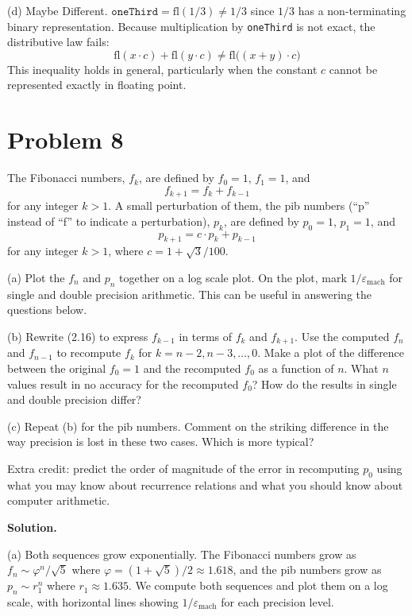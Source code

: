 \documentclass[letterpaper, 11pt]{article}
\newcommand{\1}{\mathds{1}}	%
\newcommand{\fl}{\text{fl}}	%
\theoremstyle{definition}
\begin{document}
\medskip

(d) Maybe Different.
$\texttt{oneThird} = \fl(1/3) \neq 1/3$ since $1/3$ has a non-terminating binary representation. Because multiplication by \texttt{oneThird} is not exact, the distributive law fails:
\[
\fl(x \cdot c) + \fl(y \cdot c) \neq \fl\bigl((x+y) \cdot c\bigr)
\]
This inequality holds in general, particularly when the constant $c$ cannot be represented exactly in floating point.

\section*{Problem 8}

The Fibonacci numbers, $f_k$, are defined by $f_0 = 1$, $f_1 = 1$, and
\[
f_{k+1} = f_k + f_{k-1} \tag{2.16}
\]
for any integer $k > 1$. A small perturbation of them, the pib numbers (``p'' instead of ``f'' to indicate a perturbation), $p_k$, are defined by $p_0 = 1$, $p_1 = 1$, and
\[
p_{k+1} = c \cdot p_k + p_{k-1}
\]
for any integer $k > 1$, where $c = 1 + \sqrt{3}/100$.

(a) Plot the $f_n$ and $p_n$ together on a log scale plot. On the plot, mark $1/\varepsilon_{\mathrm{mach}}$ for single and double precision arithmetic. This can be useful in answering the questions below.

(b) Rewrite (2.16) to express $f_{k-1}$ in terms of $f_k$ and $f_{k+1}$. Use the computed $f_n$ and $f_{n-1}$ to recompute $f_k$ for $k = n-2, n-3, \ldots, 0$. Make a plot of the difference between the original $f_0 = 1$ and the recomputed $f_0$ as a function of $n$. What $n$ values result in no accuracy for the recomputed $f_0$? How do the results in single and double precision differ?

(c) Repeat (b) for the pib numbers. Comment on the striking difference in the way precision is lost in these two cases. Which is more typical?

Extra credit: predict the order of magnitude of the error in recomputing $p_0$ using what you may know about recurrence relations and what you should know about computer arithmetic.

\medskip

\textbf{Solution.}

(a) Both sequences grow exponentially. The Fibonacci numbers grow as $f_n \sim \varphi^n/\sqrt{5}$ where $\varphi = (1+\sqrt{5})/2 \approx 1.618$, and the pib numbers grow as $p_n \sim r_1^n$ where $r_1 \approx 1.635$. We compute both sequences and plot them on a log scale, with horizontal lines showing $1/\varepsilon_{\mathrm{mach}}$ for each precision level.
\end{document}
